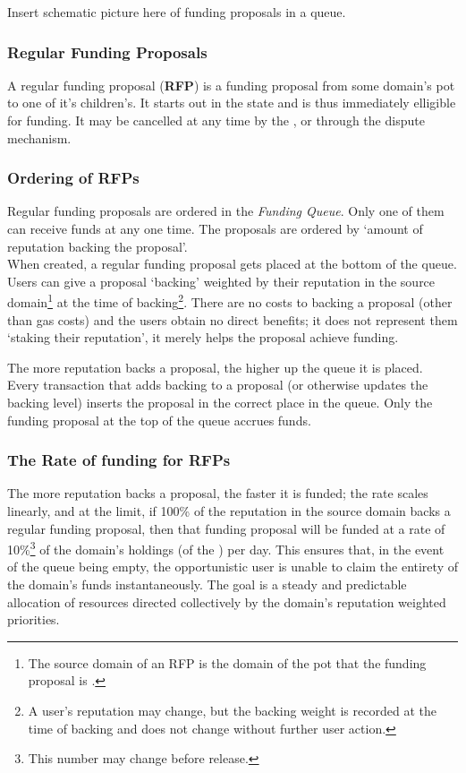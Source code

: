 Insert schematic picture here of funding proposals in a queue.\\[2cm]








\subsubsection{Regular Funding Proposals}
A regular funding proposal (\textbf{RFP}) is a funding proposal from some domain's pot to one of it's children's. It starts out in the  state and is thus immediately elligible for funding. It may be cancelled at any time by the , or through the dispute mechanism.

\subsubsection*{Ordering of RFPs}
Regular funding proposals are ordered in the \emph{Funding Queue}. Only one of them can receive funds at any one time. The proposals are ordered by `amount of reputation backing the proposal'.\\
When created, a regular funding proposal gets placed at the bottom of the queue. Users can give a proposal `backing' weighted by their reputation in the source domain\footnote{The source domain of an RFP is the domain of the pot that the funding proposal is .} at the time of backing\footnote{A user's reputation may change, but the backing weight is recorded at the time of backing and does not change without further user action.}. There are no costs to backing a proposal (other than gas costs) and the users obtain no direct benefits; it does not represent them `staking their reputation', it merely helps the proposal achieve funding.

The more reputation backs a proposal, the higher up the queue it is placed. Every transaction that adds backing to a proposal (or otherwise updates the backing level) inserts the proposal in the correct place in the queue. Only the funding proposal at the top of the queue accrues funds.\\

\subsubsection*{The Rate of funding for RFPs}
The more reputation backs a proposal, the faster it is funded; the rate scales linearly, and at the limit, if 100\% of the reputation in the source domain backs a regular funding proposal, then that funding proposal will be funded at a rate of 10\%\footnote{This number may change before release.} of the domain's holdings (of the ) per day. This ensures that, in the event of the queue being empty, the opportunistic user is unable to claim the entirety of the domain's funds instantaneously. The goal is a steady and predictable allocation of resources directed collectively by the domain's reputation weighted priorities.

